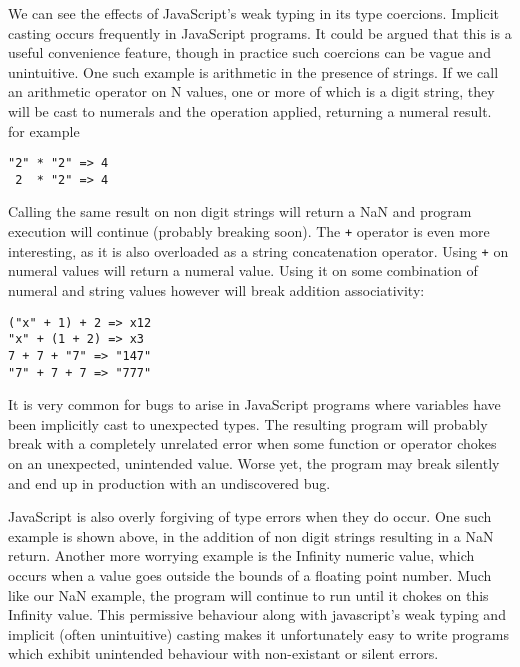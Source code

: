 We can see the effects of JavaScript's weak typing in its type coercions. 
Implicit casting occurs frequently in JavaScript programs. It could be argued
that this is a useful convenience feature, though in practice such coercions
can be vague and unintuitive. One such example is arithmetic in the presence
of strings. If we call an arithmetic operator on N values,
one or more of which is a digit string, they will be cast to numerals and
the operation applied, returning a numeral result. for example

\begin{center}
	\verb!"2" * "2" => 4! \\
	\verb! 2  * "2" => 4!
\end{center}

\noindent Calling the same result on non digit strings will return a NaN and
program execution will continue (probably breaking soon). The \verb!+! operator
is even more interesting, as it is also overloaded as a string concatenation
operator. Using \verb!+! on numeral values will return a numeral value. 
Using it on some combination of numeral and string values however will break
addition associativity:

\begin{center}
	\verb!("x" + 1) + 2 => x12! \\
	\verb!"x" + (1 + 2) => x3! \\
	\verb!7 + 7 + "7" => "147"! \\
	\verb!"7" + 7 + 7 => "777"!
\end{center}

\noindent It is very common for bugs to arise in JavaScript programs where
variables have been implicitly cast to unexpected types. The
resulting program will probably break with a completely unrelated error
when some function or operator chokes on an unexpected, unintended value.
Worse yet, the program may break silently and end up in production with 
an undiscovered bug.

JavaScript is also overly forgiving of type errors when they do occur.
One such example is shown above, in the addition of non digit strings
resulting in a NaN return. Another more worrying example is the Infinity
numeric value, which occurs when a value goes outside the bounds of
a floating point number. Much like our NaN example, the program will
continue to run until it chokes on this Infinity value. This permissive
behaviour along with javascript's weak typing and implicit (often unintuitive)
casting makes it unfortunately easy to write programs which exhibit
unintended behaviour with non-existant or silent errors.
 


